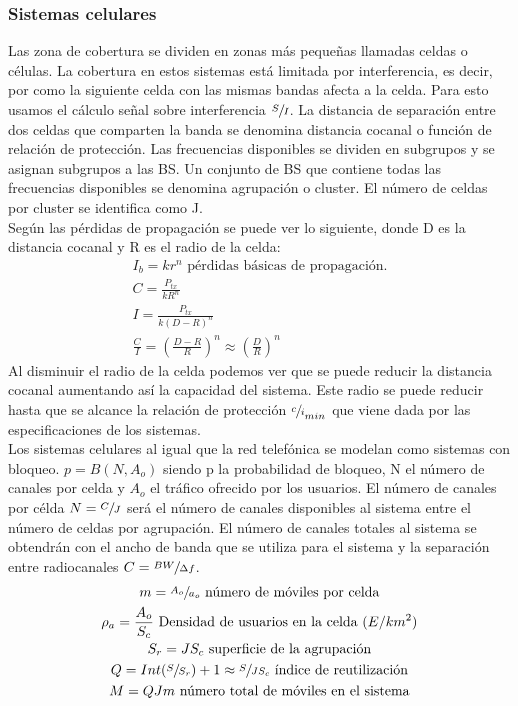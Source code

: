 \subsubsection{Sistemas celulares}
\label{ssub:celulares}
	Las zona de cobertura se dividen en zonas más pequeñas llamadas celdas o células. La cobertura en estos sistemas está limitada por interferencia, es decir, por como la siguiente celda con las mismas bandas afecta a la celda. Para esto usamos el cálculo señal sobre interferencia $\sfrac{S}{I}$. La distancia de separación entre dos celdas que comparten la banda se denomina distancia cocanal o función de relación de protección. Las frecuencias disponibles se dividen en subgrupos y se asignan subgrupos a las \acrshort{BS}. Un conjunto de \acrshort{BS} que contiene todas las frecuencias disponibles se denomina agrupación o cluster. El número de celdas por cluster se identifica como J.\\
	Según las pérdidas de propagación se puede ver lo siguiente, donde D es la distancia cocanal y R es el radio de la celda:
\begin{gather*}
	I_b=kr^n\text{ pérdidas básicas de propagación.}\\
	C=\frac{P_{tx}}{kR^n}\\
	I=\frac{P_{tx}}{k(D-R)^n}\\
	\frac{C}{I}=(\frac{D-R}{R})^n\approx (\frac{D}{R})^n
\end{gather*}
Al disminuir el radio de la celda podemos ver que se puede reducir la distancia cocanal aumentando así la capacidad del sistema. Este radio se puede reducir hasta que se alcance la relación de protección $\sfrac{c}{i}_{min}$ que viene dada por las especificaciones de los sistemas.\\
Los sistemas celulares al igual que la red telefónica se modelan como sistemas con bloqueo. $p=B(N,A_o)$ siendo p la probabilidad de bloqueo, N el número de canales por celda y $A_o$ el tráfico ofrecido por los usuarios. El número de canales por célda $N=\sfrac{C}{J}$ será el número de canales disponibles al sistema entre el número de celdas por agrupación. El número de canales totales al sistema se obtendrán con el ancho de banda que se utiliza para el sistema y la separación entre radiocanales $C=\sfrac{BW}{\Delta f}$.\\
\begin{gather*}
	m=\sfrac{A_o}{a_o}\text{ número de móviles por celda}\\
	\rho_a=\frac{A_o}{S_c}\text{ Densidad de usuarios en la celda }(E/km^2)\\
	S_r=JS_c\text{ superficie de la agrupación}\\
	Q=Int(\sfrac{S}{S_r})+1\approx \sfrac{S}{JS_c}\text{ índice de reutilización}\\
	M=QJm\text{ número total de móviles en el sistema}\\
\end {gather*}
